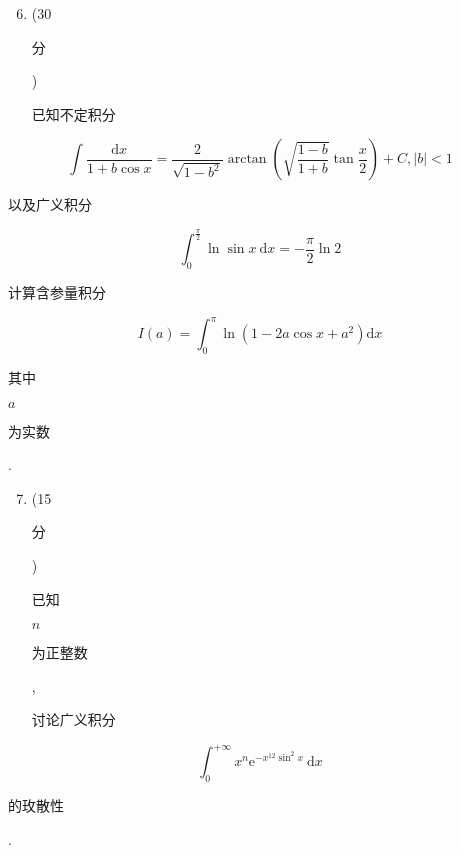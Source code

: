 \documentclass[10pt]{article}
\begin{document}
\begin{enumerate}
  \setcounter{enumi}{5}
  \item (30 \begin{CJK}{UTF8}{mj}分\end{CJK}) \begin{CJK}{UTF8}{mj}已知不定积分\end{CJK}
\end{enumerate}
$$
\int \frac{\mathrm{d} x}{1+b \cos x}=\frac{2}{\sqrt{1-b^{2}}} \arctan \left(\sqrt{\frac{1-b}{1+b}} \tan \frac{x}{2}\right)+C,|b|<1
$$
\begin{CJK}{UTF8}{mj}以及广义积分\end{CJK}
$$
\int_{0}^{\frac{\pi}{2}} \ln \sin x \mathrm{~d} x=-\frac{\pi}{2} \ln 2
$$
\begin{CJK}{UTF8}{mj}计算含参量积分\end{CJK}
$$
I(a)=\int_{0}^{\pi} \ln \left(1-2 a \cos x+a^{2}\right) \mathrm{d} x
$$
\begin{CJK}{UTF8}{mj}其中\end{CJK} $a$ \begin{CJK}{UTF8}{mj}为实数\end{CJK}.

\begin{enumerate}
  \setcounter{enumi}{6}
  \item (15 \begin{CJK}{UTF8}{mj}分\end{CJK}) \begin{CJK}{UTF8}{mj}已知\end{CJK} $n$ \begin{CJK}{UTF8}{mj}为正整数\end{CJK}, \begin{CJK}{UTF8}{mj}讨论广义积分\end{CJK}
\end{enumerate}
$$
\int_{0}^{+\infty} x^{n} \mathrm{e}^{-x^{12} \sin ^{2} x} \mathrm{~d} x
$$
\begin{CJK}{UTF8}{mj}的玫散性\end{CJK}.
\end{document}
